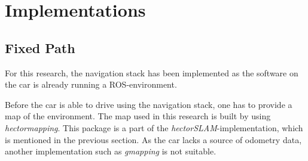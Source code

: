\documentclass[conference,a4paper]{IEEEtran}
\begin{document}
\section{Implementations}
\label{sec:Implementations}
\subsection{Fixed Path}
For this research, the navigation stack has been implemented as the software on the car is already running a ROS-environment.

Before the car is able to drive using the navigation stack, one has to provide a map of the environment. The map used in this research is built by using \emph{hector\textunderscore mapping}. This package is a part of the \emph{hector\textunderscore SLAM}-implementation, which is mentioned in the previous section. As the car lacks a source of odometry data, another implementation such as \emph{gmapping} is not suitable.
\end{document}
